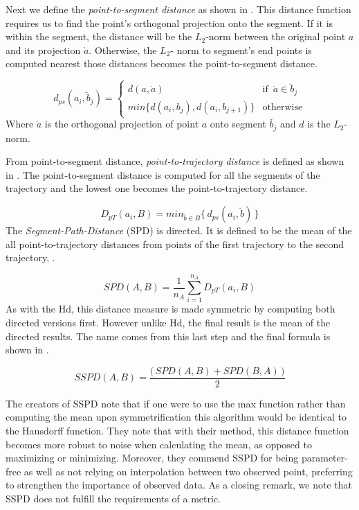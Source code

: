 Next we define the \textit{point-to-segment distance} as shown in . This distance function requires us to find the point’s orthogonal projection onto the segment. 
If it is within the segment, the distance will be the  $L_2$-norm between the original point $a$ and its projection $\dot{a}$.
Otherwise, the  $L_2$- norm to segment's end points is computed nearest those distances becomes the point-to-segment distance.  

\begin{equation}
\label{eq:sspd-ps}
d_{ps}(a_i, \breve{b}_j) =  \begin{cases}
d(a, \dot{a})  &\text{if} \enspace \dot{a} \in \breve{b}_j\\
min\{ d(a_i, b_j), d(a_i, b_{j+1})\}  &\text{otherwise}
\end{cases}
\end{equation}
Where $\dot{a}$ is the orthogonal projection of point  $a$ onto segment  $\breve{b_j} $ and $d$ is the $L_2$-norm. 

From point-to-segment distance, \textit{point-to-trajectory distance} is defined as shown in . 
The point-to-segment distance is computed for all the segments of the trajectory and the lowest one becomes the point-to-trajectory distance.

\begin{equation}
\label{eq:sspd-pt}
D_{pT}(a_i, B) = min_{\breve{b} \in B} \big\{ \, d_{ps}(a_i, \breve{b})\, \big\}
\end{equation}
The \textit{Segment-Path-Distance} (SPD) is directed.
It is defined to be the mean of the all point-to-trajectory distances from points of the first trajectory to the second trajectory, .

\begin{equation}
\label{eq:sspd-spd}
SPD(A, B) = \frac{1}{n_A} \sum_{i=1}^{n_A} D_{pT} (a_i, B)
\end{equation}
As with the Hd, this distance measure is made symmetric by computing both directed versions first. However unlike Hd, the final result is the mean of the directed results. The name comes from this last step and the final formula is shown in .
 
 \begin{equation}
\label{eq:sspd-main}
SSPD(A, B) = \frac{\big( \, SPD(A, B) + SPD(B, A)\, \big)}{2}
\end{equation}

 
The creators of SSPD note that if one were to use the max function rather than computing the mean upon symmetrification this algorithm would be identical to the Hausdorff function\cite{50-ReviewPerspective}. 
They note that with their method, this distance function becomes more robust to noise when calculating the mean, as opposed to maximizing or minimizing.  
Moreover, they commend SSPD for being parameter-free as well as not relying on interpolation between two observed point, preferring to strengthen the importance of observed data. 
As a closing remark, we note that SSPD does not fulfill the requirements of a metric. 

